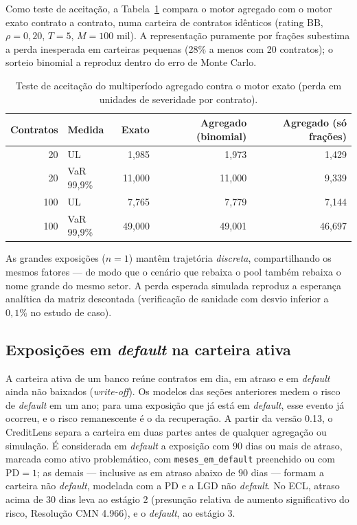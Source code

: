 \documentclass[11pt,a4paper]{article}
\begin{document}
Como teste de aceitação, a Tabela~\ref{tab:mig-aceite} compara o motor agregado com o motor exato contrato a contrato, numa carteira de contratos idênticos (rating BB, $\rho=0{,}20$, $T=5$, $M=100$ mil). A representação puramente por frações subestima a perda inesperada em carteiras pequenas (28\% a menos com 20 contratos); o sorteio binomial a reproduz dentro do erro de Monte Carlo.
\begin{table}[H]
\centering\small
\begin{tabular}{rlrrr}
\toprule
Contratos & Medida & Exato & Agregado (binomial) & Agregado (só frações)\\
\midrule
20 & UL & 1{,}985 & 1{,}973 & 1{,}429\\
20 & VaR 99{,}9\% & 11{,}000 & 11{,}000 & 9{,}339\\
100 & UL & 7{,}765 & 7{,}779 & 7{,}144\\
100 & VaR 99{,}9\% & 49{,}000 & 49{,}001 & 46{,}697\\
\bottomrule
\end{tabular}
\caption{Teste de aceitação do multiperíodo agregado contra o motor exato (perda em unidades de severidade por contrato).}
\label{tab:mig-aceite}
\end{table} As grandes exposições ($n=1$) mantêm trajetória \emph{discreta}, compartilhando os mesmos fatores --- de modo que o cenário que rebaixa o pool também rebaixa o nome grande do mesmo setor. A perda esperada simulada reproduz a esperança analítica da matriz descontada (verificação de sanidade com desvio inferior a $0{,}1\%$ no estudo de caso).

\subsection{Exposições em \emph{default} na carteira ativa}
\label{sec:default}

A carteira ativa de um banco reúne contratos em dia, em atraso e em \emph{default} ainda não baixados (\emph{write-off}). Os modelos das seções anteriores medem o risco de \emph{default} em um ano; para uma exposição que já está em \emph{default}, esse evento já ocorreu, e o risco remanescente é o da recuperação. A partir da versão 0.13, o CreditLens separa a carteira em duas partes antes de qualquer agregação ou simulação. É considerada em \emph{default} a exposição com $90$ dias ou mais de atraso, marcada como ativo problemático, com \texttt{meses\_em\_default} preenchido ou com $\mathrm{PD}=1$; as demais --- inclusive as em atraso abaixo de $90$ dias --- formam a carteira não \emph{default}, modelada com a PD e a LGD não \emph{default}. No ECL, atraso acima de $30$ dias leva ao estágio 2 (presunção relativa de aumento significativo do risco, Resolução CMN 4.966), e o \emph{default}, ao estágio 3.
\end{document}
